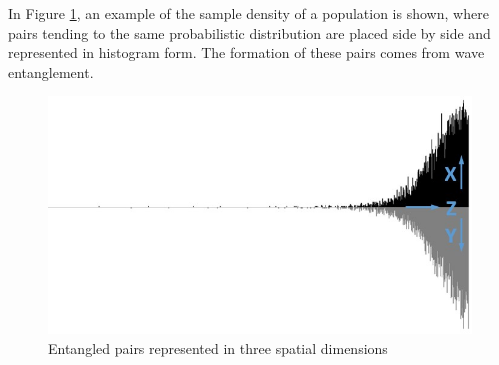 In Figure \ref{fig:consciousness_space_waves}, an example of the sample density of a population is shown, where pairs tending to the same probabilistic distribution are placed side by side and represented in histogram form. The formation of these pairs comes from wave entanglement.
	\begin{figure}[H]
	\caption{Entangled pairs represented in three spatial dimensions}
	\label{fig:consciousness_space_waves}
	\centering
	\includegraphics[scale=.7]{sections/images/consciousness_space_waves.jpg}
	\end{figure}

